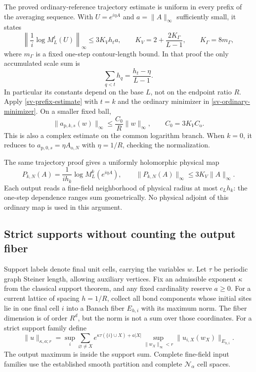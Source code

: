 \documentclass[11pt]{article}
\theoremstyle{remark}\newtheorem{remark}[theorem]{Remark}
\begin{document}
The proved ordinary-reference trajectory estimate is uniform in every
prefix of the averaging sequence. With $U=e^{i\eta A}$ and
$a=\|A\|_\infty$ sufficiently small, it states
\begin{equation}
 \left\|\frac1i\log M_L^t(U)\right\|_\infty
 \le 3K_Vh_ta,\qquad
 K_V=2+\frac{2K_\Gamma}{L-1},\qquad K_\Gamma=8m_\Gamma,
 \label{sv-prefix-estimate}
\end{equation}
where $m_\Gamma$ is a fixed one-step contour-length bound. In that proof
the only accumulated scale sum is
\begin{equation}
 \sum_{q<t}h_q=\frac{h_t-\eta}{L-1}.
 \label{sv-prefix-sum}
\end{equation}
In particular its constants depend on the base $L$, not on the endpoint
ratio $R$. Apply \eqref{sv-prefix-estimate} with $t=k$ and the ordinary
minimizer in \eqref{sv-ordinary-minimizer}. On a smaller fixed ball,
\begin{equation}
 \boxed{\quad
 \|a_{\mathrm p,k,s}(w)\|_\infty
       \le \frac{C_0}{R}\|w\|_\infty,\qquad
 C_0=3K_VC_{\mathrm o}.
 \quad}
 \label{sv-amplitude}
\end{equation}
This is also a complex estimate on the common logarithm branch. When
$k=0$, it reduces to $a_{\mathrm p,0,s}=\eta A_{\mathrm o,N}$ with
$\eta=1/R$, checking the normalization.

The same trajectory proof gives a uniformly holomorphic physical map
\begin{equation}
 P_{k,N}(A)=\frac1{ih_k}\log M_L^k(e^{i\eta A}),\qquad
 \|P_{k,N}(A)\|_\infty\le 3K_V\|A\|_\infty.
 \label{sv-physical-prefix-map}
\end{equation}
Each output reads a fine-field neighborhood of physical radius at most
$c_Lh_k$: the one-step dependence ranges sum geometrically. No physical
adjoint of this ordinary map is used in this argument.

\subsection{Strict supports without counting the output fiber}
\label{sv-support-section}

Support labels denote final unit cells, carrying the variables $w$.
Let $\tau$ be periodic graph Steiner length, allowing auxiliary vertices.
Fix an admissible exponent $\kappa$ from the classical support theorem,
and any fixed cardinality reserve $a\ge0$. For a current lattice of
spacing $h=1/R$, collect all bond components whose initial sites lie in
one final cell $i$ into a Banach fiber $E_{h,i}$ with its maximum norm.
The fiber dimension is of order $R^d$, but the norm is not a sum over
those coordinates. For a strict support family define
\begin{equation}
 \|u\|_{\kappa,a;r}
 =\sup_i\sum_{\varnothing\ne X}
 e^{\kappa\tau(\{i\}\cup X)+a|X|}
 \sup_{\|w_X\|_\infty<r}\|u_{i,X}(w_X)\|_{E_{h,i}}.
 \label{sv-family-norm}
\end{equation}
The output maximum is inside the support sum. Complete fine-field input
families use the established smooth partition and complete
$\mathcal N_\alpha$ cell spaces.
\end{document}
